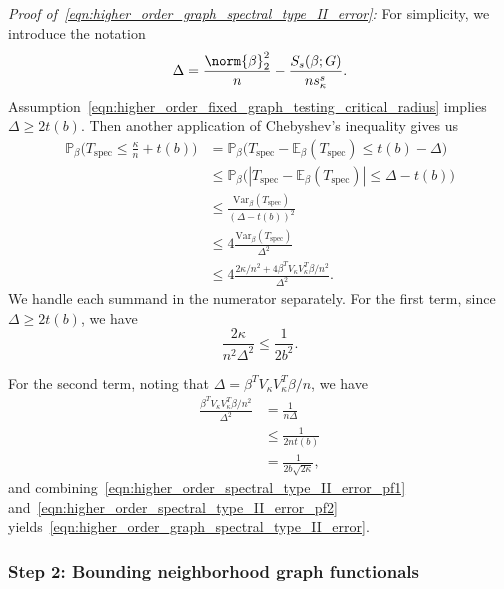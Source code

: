 \documentclass{article}
\newcommand{\abs}[1]{\left \lvert #1 \right \rvert}
\newcommand{\Var}{\mathrm{Var}}
\newcommand{\1}{\mathbf{1}}
\newcommand{\Pbb}{\mathbb{P}}
\newcommand{\Ebb}{\mathbb{E}}
\newcommand{\spec}{\mathrm{spec}}
\theoremstyle{alden}
\theoremstyle{aldenthm}
\theoremstyle{definition}
\theoremstyle{remark}
\begin{document}
\textit{Proof of~\eqref{eqn:higher_order_graph_spectral_type_II_error}:} For simplicity, we introduce the notation
\begin{equation*}
\Delta = \frac{\norm{\beta}_2^2}{n} - \frac{S_s(\beta;G)}{ns_{\kappa}^s}.
\end{equation*}
Assumption~\eqref{eqn:higher_order_fixed_graph_testing_critical_radius} implies $\Delta \geq 2 t(b)$. Then another application of Chebyshev's inequality gives us
\begin{align*}
\Pbb_{\beta}\bigl(T_{\spec} \leq \frac{\kappa}{n} + t(b)\bigr) & = \Pbb_{\beta}\bigl(T_{\spec} - \Ebb_{\beta}(T_{\spec}) \leq t(b) - \Delta \bigr) \\
& \leq \Pbb_{\beta}\bigl(\abs{T_{\spec} - \Ebb_{\beta}(T_{\spec})} \leq \Delta - t(b) \bigr) \tag{since $\Delta \geq t(b)$}	\\
& \leq \frac{\Var_{\beta}(T_{\spec})}{(\Delta - t(b))^2} \\
& \leq 4\frac{\Var_{\beta}(T_{\spec})}{\Delta^2} \tag{since $\Delta \geq 2t(b)$} \\
& \leq 4\frac{2\kappa/n^2 + 4\beta^T V_{\kappa} V_{\kappa}^T \beta /n^2}{\Delta^2}.
\end{align*}
We handle each summand in the numerator separately. For the first term, since $\Delta \geq 2 t(b)$, we have
\begin{equation}
\label{eqn:higher_order_spectral_type_II_error_pf1}
\frac{2\kappa}{n^2\Delta^2} \leq \frac{1}{2b^2}.
\end{equation}

For the second term, noting that $\Delta = \beta^T V_{\kappa} V_{\kappa}^T \beta/n$, we have
\begin{align}
\frac{\beta^T V_{\kappa} V_{\kappa}^T \beta/n^2}{\Delta^2} & = \frac{1}{n\Delta} \nonumber \\
& \leq \frac{1}{2nt(b)} \nonumber \\
& = \frac{1}{2b\sqrt{2\kappa}}, \label{eqn:higher_order_spectral_type_II_error_pf2}
\end{align}
and combining~\eqref{eqn:higher_order_spectral_type_II_error_pf1} and~\eqref{eqn:higher_order_spectral_type_II_error_pf2} yields~\eqref{eqn:higher_order_graph_spectral_type_II_error}.


\subsubsection{Step 2: Bounding neighborhood graph functionals}
\end{document}
